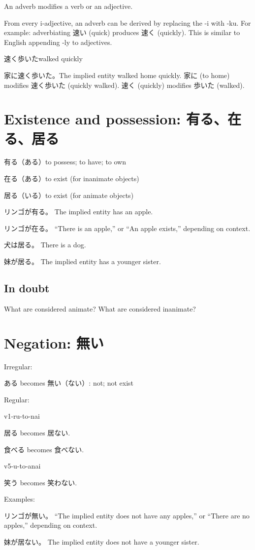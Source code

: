 An adverb modifies a verb or an adjective.

From every i-adjective,
an adverb can be derived by replacing the -i with -ku.
For example: adverbiating 速い (quick) produces 速く (quickly).
This is similar to English appending -ly to adjectives.

速く歩いたwalked quickly

家に速く歩いた。The implied entity walked home quickly.
家に (to home) modifies 速く歩いた (quickly walked).
速く (quickly) modifies 歩いた (walked).

\section{Existence and possession: 有る、在る、居る}

有る（ある）to possess; to have; to own

在る（ある）to exist (for inanimate objects)

居る（いる）to exist (for animate objects)

リンゴが有る。
The implied entity has an apple.

リンゴが在る。
``There is an apple,''
or ``An apple exists,''
depending on context.

犬は居る。
There is a dog.

妹が居る。
The implied entity has a younger sister.

\subsection{In doubt}

What are considered animate?
What are considered inanimate?

\section{Negation: 無い}

Irregular:

ある becomes 無い（ない）: not; not exist

Regular:

v1-ru-to-nai

居る becomes 居ない.

食べる becomes 食べない.

v5-u-to-anai

笑う becomes 笑わない.

Examples:

リンゴが無い。
``The implied entity does not have any apples,''
or ``There are no apples,''
depending on context.

妹が居ない。
The implied entity does not have a younger sister.
